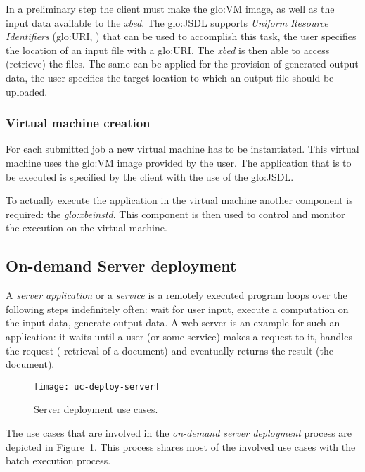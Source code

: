 In a preliminary step the client must make the \gls{glo:VM} image, as well
as  the  input data  available  to  the  \emph{xbed}.  The  \gls{glo:JSDL}
supports     \emph{Uniform    Resource     Identifiers}    (\gls{glo:URI},
\cite{rfc2396}) that  can be  used to accomplish  this task, \ie  the user
specifies  the location  of  an  input file  with  a \gls{glo:URI}.   The
\emph{xbed} is then able to access  (retrieve) the files.  The same can be
applied for the provision of generated output data, \ie the user specifies
the target location to which an output file should be uploaded.

\subsubsection{Virtual machine creation}

For each submitted job a new  virtual machine has to be instantiated. This
virtual  machine uses  the \gls{glo:VM}  image provided  by the  user. The
application that is to be executed is specified by the client with the use
of the \gls{glo:JSDL}.

To  actually  execute  the  application  in the  virtual  machine  another
component  is required: the  \emph{\gls{glo:xbeinstd}}. This  component is
then used to control and monitor the execution on the virtual machine.

\subsection{On-demand Server deployment}
\label{sec:req:server-deployment}

A  \emph{server application} or  a \emph{service}  is a  remotely executed
program loops over  the following steps indefinitely often:  wait for user
input, execute a  computation on the input data,  generate output data.  A
web server is  an example for such an application: it  waits until a user
(or  some  service)  makes a  request  to  it,  handles the  request  (\ie
retrieval  of a  document)  and  eventually returns  the  result (\ie  the
document).

\begin{figure}[ht]
  \centering
  \texttt{[image: uc-deploy-server]}
  \caption{Server deployment use cases.}
  \label{fig:uc-server-deployment}
\end{figure}

The use cases that are  involved in the \emph{on-demand server deployment}
process  are   depicted  in  Figure~\ref{fig:uc-server-deployment}.   This
process shares  most of  the involved use  cases with the  batch execution
process.

